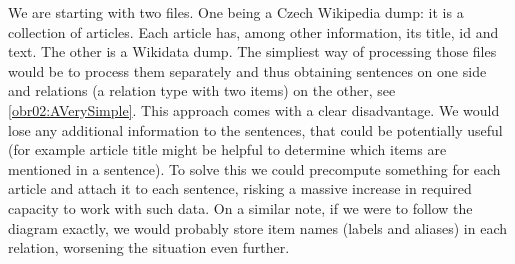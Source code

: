 We are starting with two files. One being a Czech Wikipedia dump: it is a collection of articles. Each article has, among other information, its title, id and text. The other is a Wikidata dump. The simpliest way of processing those files would be to process them separately and thus obtaining sentences on one side and relations (a relation type with two items) on the other, see \ref{obr02:AVerySimple}. This approach comes with a clear disadvantage. We would lose any additional information to the sentences, that could be potentially useful (for example article title might be helpful to determine which items are mentioned in a sentence). To solve this we could precompute something for each article and attach it to each sentence, risking a massive increase in required capacity to work with such data. On a similar note, if we were to follow the diagram exactly, we would probably store item names (labels and aliases) in each relation, worsening the situation even further.

\begin{figure}
\centering
{}
\qquad
{}
\end{figure}


